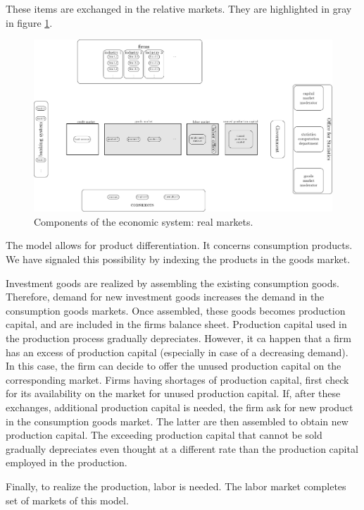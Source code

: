 \documentclass{book}
\begin{document}
These items are exchanged in the relative markets. They are highlighted in gray in figure \ref{fig:componentsc2}.


\begin{figure}[htp]
\hskip-1cm\includegraphics[scale=0.5]{agents_and_interactions_figure1c2-0.pdf}
	\caption{Components of the economic system: real markets.}
	\label{fig:componentsc2}
\end{figure}

The model allows for product differentiation. It concerns consumption products. We have signaled this possibility by indexing the products in the goods market.

Investment goods are realized by assembling the existing consumption goods. Therefore, demand for new investment goods increases the demand in the consumption goods markets. Once assembled, these goods becomes production capital, and are included in the firms balance sheet. Production capital used in the production process gradually depreciates. However, it ca happen that a firm has an excess of production capital (especially in case of a decreasing demand). In this case, the firm can decide to offer the unused production capital on the corresponding market. 
Firms having shortages of production capital, first check for its availability on the market for unused production capital. If, after these exchanges, additional production capital is needed, the firm ask for new product in the consumption goods market. The latter are then assembled to obtain new production capital. The exceeding production capital that cannot be sold gradually depreciates even thought at a different rate than the production capital employed in the production.

Finally, to realize the production, labor is needed.  The labor market completes set of markets of this model.  
\end{document}
